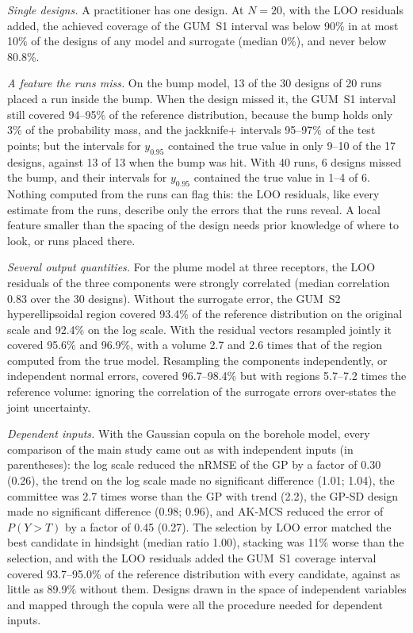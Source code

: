\emph{Single designs.} A practitioner has one design. At $N=20$, with the
LOO residuals added, the achieved coverage of the GUM~S1 interval was below
90\% in at most 10\% of the designs of any model and surrogate (median 0\%),
and never below 80.8\%.

\emph{A feature the runs miss.} On the bump model, 13 of the 30 designs of
20 runs placed a run inside the bump. When the design missed it, the GUM~S1
interval still covered 94--95\% of the reference distribution, because the
bump holds only 3\% of the probability mass, and the jackknife+ intervals
95--97\% of the test points; but the intervals for $y_{0.95}$ contained the
true value in only 9--10 of the 17 designs, against 13 of 13 when the bump
was hit. With 40 runs, 6 designs missed the bump, and their intervals for
$y_{0.95}$ contained the true value in 1--4 of 6. Nothing computed from the
runs can flag this: the LOO residuals, like every estimate from the runs,
describe only the errors that the runs reveal. A local feature smaller than
the spacing of the design needs prior knowledge of where to look, or runs
placed there.

\emph{Several output quantities.} For the plume model at three receptors,
the LOO residuals of the three components were strongly correlated (median
correlation 0.83 over the 30 designs). Without the surrogate error, the
GUM~S2 hyperellipsoidal region covered 93.4\% of the reference distribution
on the original scale and 92.4\% on the log scale. With the residual
vectors resampled jointly it covered 95.6\% and 96.9\%, with a volume 2.7
and 2.6 times that of the region computed from the true model. Resampling
the components independently, or independent normal errors, covered
96.7--98.4\% but with regions 5.7--7.2 times the reference volume: ignoring
the correlation of the surrogate errors over-states the joint uncertainty.

\emph{Dependent inputs.} With the Gaussian copula on the borehole model,
every comparison of the main study came out as with independent inputs (in
parentheses): the log scale reduced the nRMSE of the GP by a factor of 0.30
(0.26), the trend on the log scale made no significant difference (1.01;
1.04), the committee was 2.7 times worse than the GP with trend (2.2), the
GP-SD design made no significant difference (0.98; 0.96), and AK-MCS
reduced the error of $P(Y>T)$ by a factor of 0.45 (0.27). The selection by
LOO error matched the best candidate in hindsight (median ratio 1.00),
stacking was 11\% worse than the selection, and with the LOO residuals added
the GUM~S1 coverage interval covered 93.7--95.0\% of the reference
distribution with every candidate, against as little as 89.9\% without
them. Designs drawn in the space of independent variables and mapped
through the copula were all the procedure needed for dependent inputs.

